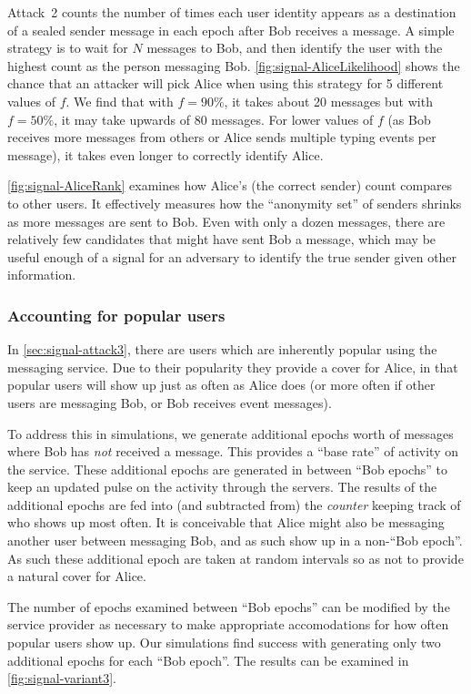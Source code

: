 Attack~2 counts the number of times each user identity
appears as a destination of a sealed sender message in each epoch after Bob
receives a message. A simple strategy is to wait for $N$ messages to Bob, and
then identify the user with the highest count as the person messaging Bob.
\cref{fig:signal-AliceLikelihood} shows the chance that an attacker will pick
Alice when using this strategy for 5 different values of $f$. We find that with
$f = 90\%$, it takes about 20 messages but with $f = 50\%$, it may take upwards
of 80 messages. For lower values of $f$ (as Bob receives more messages from
others or Alice sends multiple typing events per message), it takes even longer
to correctly identify Alice.


\cref{fig:signal-AliceRank} examines how Alice's (the correct sender) count
compares to other users. It effectively measures how the
``anonymity set'' of senders shrinks as more messages are sent to Bob. Even with
only a dozen messages, there are relatively few candidates that might have sent
Bob a message, which may be useful enough of a signal for an adversary to
identify the true sender given other information.

\subsubsection{Accounting for popular users}
In \cref{sec:signal-attack3}, there are users which are inherently popular
using the messaging service. Due to their popularity they provide a cover for
Alice, in that popular users will show up just as often as Alice does (or more
often if other users are messaging Bob, or Bob receives event messages).

To address this in simulations, we generate additional epochs worth of messages
where Bob has \emph{not} received a message. This provides a ``base rate'' of
activity on the service. These additional epochs are generated in between ``Bob
epochs'' to keep an updated pulse on the activity through the servers. The
results of the additional epochs are fed into (and subtracted from) the
\emph{counter} keeping track of who shows up most often. It is conceivable that
Alice might also be messaging another user between messaging Bob, and as such
show up in a non-``Bob epoch''. As such these additional epoch are taken at
random intervals so as not to provide a natural cover for Alice.

The number of epochs examined between ``Bob epochs'' can be modified by the
service provider as necessary to make appropriate accomodations for how often
popular users show up. Our simulations find success with generating only two
additional epochs for each ``Bob epoch''. The results can be examined in
\cref{fig:signal-variant3}.

